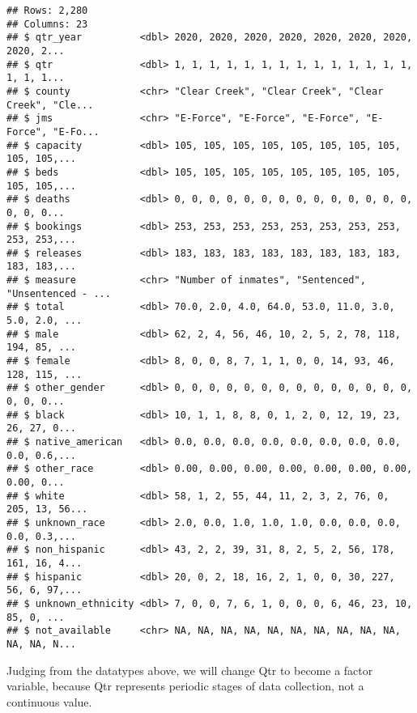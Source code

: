 \documentclass[
]{article}
\newenvironment{Shaded}{\begin{snugshade}}{\end{snugshade}}
\newcommand{\DataTypeTok}[1]{\textcolor[rgb]{0.13,0.29,0.53}{#1}}
\newcommand{\KeywordTok}[1]{\textcolor[rgb]{0.13,0.29,0.53}{\textbf{#1}}}
\newcommand{\NormalTok}[1]{#1}
\newcommand{\OperatorTok}[1]{\textcolor[rgb]{0.81,0.36,0.00}{\textbf{#1}}}
\newcommand{\StringTok}[1]{\textcolor[rgb]{0.31,0.60,0.02}{#1}}
\begin{document}
\begin{verbatim}
## Rows: 2,280
## Columns: 23
## $ qtr_year          <dbl> 2020, 2020, 2020, 2020, 2020, 2020, 2020, 2020, 2...
## $ qtr               <dbl> 1, 1, 1, 1, 1, 1, 1, 1, 1, 1, 1, 1, 1, 1, 1, 1, 1...
## $ county            <chr> "Clear Creek", "Clear Creek", "Clear Creek", "Cle...
## $ jms               <chr> "E-Force", "E-Force", "E-Force", "E-Force", "E-Fo...
## $ capacity          <dbl> 105, 105, 105, 105, 105, 105, 105, 105, 105, 105,...
## $ beds              <dbl> 105, 105, 105, 105, 105, 105, 105, 105, 105, 105,...
## $ deaths            <dbl> 0, 0, 0, 0, 0, 0, 0, 0, 0, 0, 0, 0, 0, 0, 0, 0, 0...
## $ bookings          <dbl> 253, 253, 253, 253, 253, 253, 253, 253, 253, 253,...
## $ releases          <dbl> 183, 183, 183, 183, 183, 183, 183, 183, 183, 183,...
## $ measure           <chr> "Number of inmates", "Sentenced", "Unsentenced - ...
## $ total             <dbl> 70.0, 2.0, 4.0, 64.0, 53.0, 11.0, 3.0, 5.0, 2.0, ...
## $ male              <dbl> 62, 2, 4, 56, 46, 10, 2, 5, 2, 78, 118, 194, 85, ...
## $ female            <dbl> 8, 0, 0, 8, 7, 1, 1, 0, 0, 14, 93, 46, 128, 115, ...
## $ other_gender      <dbl> 0, 0, 0, 0, 0, 0, 0, 0, 0, 0, 0, 0, 0, 0, 0, 0, 0...
## $ black             <dbl> 10, 1, 1, 8, 8, 0, 1, 2, 0, 12, 19, 23, 26, 27, 0...
## $ native_american   <dbl> 0.0, 0.0, 0.0, 0.0, 0.0, 0.0, 0.0, 0.0, 0.0, 0.6,...
## $ other_race        <dbl> 0.00, 0.00, 0.00, 0.00, 0.00, 0.00, 0.00, 0.00, 0...
## $ white             <dbl> 58, 1, 2, 55, 44, 11, 2, 3, 2, 76, 0, 205, 13, 56...
## $ unknown_race      <dbl> 2.0, 0.0, 1.0, 1.0, 1.0, 0.0, 0.0, 0.0, 0.0, 0.3,...
## $ non_hispanic      <dbl> 43, 2, 2, 39, 31, 8, 2, 5, 2, 56, 178, 161, 16, 4...
## $ hispanic          <dbl> 20, 0, 2, 18, 16, 2, 1, 0, 0, 30, 227, 56, 6, 97,...
## $ unknown_ethnicity <dbl> 7, 0, 0, 7, 6, 1, 0, 0, 0, 6, 46, 23, 10, 85, 0, ...
## $ not_available     <chr> NA, NA, NA, NA, NA, NA, NA, NA, NA, NA, NA, NA, N...
\end{verbatim}

Judging from the datatypes above, we will change Qtr to become a factor
variable, because Qtr represents periodic stages of data collection, not
a continuous value.

\begin{Shaded}
\end{Shaded}
\end{document}
